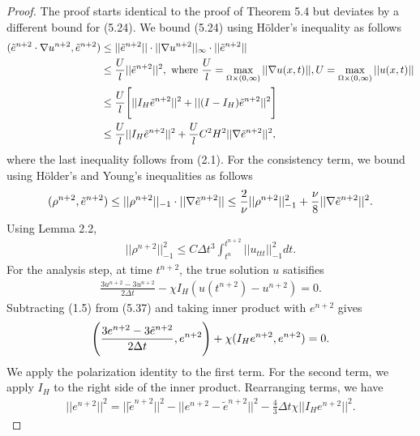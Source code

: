 \documentclass[11pt,a4paper]{article}
\begin{document}
\begin{proof}
    The proof starts identical to the proof of Theorem 5.4 but deviates by a different bound for (5.24).
    We bound (5.24) using H\"{o}lder's inequality as follows
    \begin{align}
        (\tilde{e}^{n+2}\cdot \nabla u^{n+2}, \Tilde{e}^{n+2}) 
        &\leq ||\tilde{e}^{n+2}||\cdot ||\nabla u^{n+2}||_\infty \cdot ||\Tilde{e}^{n+2}|| \notag \\
        &\leq \frac{U}{l}||\tilde{e}^{n+2}||^2, \text{ where } \frac{U}{l}=\max_{\Omega \times (0,\infty)}||\nabla u(x,t)||, U= \max_{\Omega \times (0,\infty)}|| u(x,t)||\notag \\
        &\leq \frac{U}{l}\Bigg[||I_H\tilde{e}^{n+2}||^2+ ||(I-I_H)\tilde{e}^{n+2}||^2\Bigg] \notag \\
        &\leq \frac{U}{l}||I_H\tilde{e}^{n+2}||^2+ \frac{U}{l}C^2H^2||\nabla \tilde{e}^{n+2}||^2,
    \end{align}
    where the last inequality follows from (2.1).
    For the consistency term, we bound using H\"{o}lder's and Young's inequalities as follows
    \begin{align}
        (\rho^{n+2}, \Tilde{e}^{n+2})\leq ||\rho^{n+2}||_{-1} \cdot ||\nabla \Tilde{e}^{n+2}||\leq \frac{2}{\nu}||\rho^{n+2}||_{-1}^2+\frac{\nu}{8}||\nabla \Tilde{e}^{n+2}||^2.
    \end{align}
    Using Lemma 2.2, 
    \begin{align}
        ||\rho^{n+2}||_{-1}^2\leq C\Delta t^3\int_{t^n}^{t^{n+2}}||u_{ttt}||_{-1}^2dt.
    \end{align}
    For the analysis step, at time $t^{n+2}$, the true solution $u$ satisifies
    \begin{align}
        \frac{3u^{n+2}-3u^{n+2}}{2\Delta t}-\chi I_H(u(t^{n+2})-u^{n+2})=0.
    \end{align}
    Subtracting (1.5) from (5.37) and taking inner product with $e^{n+2}$ gives
    \begin{align}
        \Bigg(\frac{3e^{n+2}-3\Tilde{e}^{n+2}}{2\Delta t}, e^{n+2}\Bigg)+\chi (I_He^{n+2},e^{n+2})=0.
    \end{align}
    We apply the polarization identity to the first term. For the second term, we apply $I_H$ to the right side of the inner product. Rearranging terms, we have 
    \begin{align}
        ||e^{n+2}||^2=||\tilde{e}^{n+2}||^2-||e^{n+2}-\tilde{e}^{n+2}||^2-\frac{4}{3}\Delta t\chi ||I_He^{n+2}||^2.
    \end{align}

\end{proof}
\end{document}
